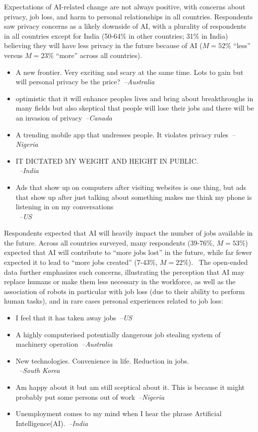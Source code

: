 \documentclass[sigconf]{acmart}
\newcommand\aff[1]{\textcolor{darkplum}{{\emph{--#1}}}}
\newcommand\q[1]{\textcolor{Mahogany}{\small{\textbf{}}}}
\newenvironment{lq2}
{ \begin{itemize}[leftmargin = 2.0em, rightmargin=1.0em, label={}]
    \fontsize{8.3pt}{8.9pt}\selectfont
\setlength{\itemsep}{3pt}
    \setlength{\parskip}{3pt}
    \setlength{\parsep}{3pt}     }
{ \end{itemize}                  }
\begin{document}
Expectations of AI-related change are not always positive, with concerns about privacy, job loss, and harm to personal relationships in all countries.\q{Q11,Q8,Q13}
Respondents saw privacy concerns as a likely downside of AI, with a plurality of respondents in all countries except for India (50-64\% in other countries; 31\% in India) believing they will have less privacy in the future because of AI ($M = 52\%$ ``less'' versus $M = 23\%$ ``more'' across all countries).
~\q{Q14} 

\begin{lq2}
\item A new frontier. Very exciting and scary at the same time. Lots to gain but will personal privacy be the price?~\aff{Australia}
\item optimistic that it will enhance peoples lives and bring about breakthroughs in many fields but also skeptical that people will lose their jobs and there will be an invasion of privacy~\aff{Canada}
\item A trending mobile app that undresses people. It violates privacy rules~\aff{Nigeria}
\item IT DICTATED MY WEIGHT AND HEIGHT IN PUBLIC.\\~\aff{India}
\item Ads that show up on computers after visiting websites is one thing, but ads that show up after just talking about something makes me think my phone is listening in on my conversations\\~\aff{US}
\end{lq2}

Respondents expected that AI will heavily impact the number of jobs available in the future. Across all countries surveyed, many respondents (39-76\%, $M=53\%$) expected that AI will contribute to ``more jobs lost'' in the future, while far fewer expected it to lead to ``more jobs created'' (7-43\%, $M=22\%$).~\q{Q8}
The open-ended data further emphasizes such concerns, illustrating the perception that AI may replace humans or make them less necessary in the workforce, as well as the association of robots in particular with job loss (due to their ability to perform human tasks), and in rare cases personal experiences related to job loss:~\q{U1-U4}

\begin{lq2}
\item I feel that it has taken away jobs~\aff{US}
\item A highly computerised potentially dangerous job stealing system of machinery operation~\aff{Australia}
\item New technologies. Convenience in life. Reduction in jobs.\\~\aff{South Korea}
\item Am happy about it but am still sceptical about it. This is because it might probably put some persons out of work~\aff{Nigeria}
\item Unemployment comes to my mind when I hear the phrase Artificial Intelligence(AI).~\aff{India}
\end{lq2}
\end{document}
